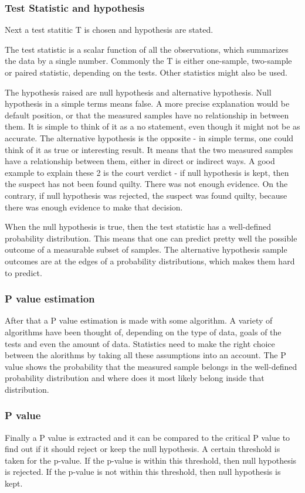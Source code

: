 \documentclass[12pt]{article}
\begin{document}
\subsubsection{Test Statistic and hypothesis}
Next a test statitic T is chosen and hypothesis are stated.

The test statistic is a scalar function of all the observations, which summarizes the data by a single number. Commonly the T is either one-sample, two-sample or paired statistic, depending on the tests. Other statistics might also be used.

The hypothesis raised are null hypothesis and alternative hypothesis. Null hypothesis in a simple terms means false. A more precise explanation would be default position, or that the measured samples have no relationship in between them. It is simple to think of it as a no statement, even though it might not be as accurate. The alternative hypothesis is the opposite - in simple terms, one could think of it as true or interesting result. It means that the two measured samples have a relationship between them, either in direct or indirect ways. A good example to explain these 2 is the court verdict - if null hypothesis is kept, then the suspect has not been found quilty. There was not enough evidence. On the contrary, if null hypothesis was rejected, the suspect was found quilty, because there was enough evidence to make that decision.

When the null hypothesis is true, then the test statistic has a well-defined probability distribution. This means that one can predict pretty well the possible outcome of a measurable subset of samples. The alternative hypothesis sample outcomes are at the edges of a probability distributions, which makes them hard to predict.

\subsubsection{P value estimation}
After that a P value estimation is made with some algorithm. A variety of algorithms have been thought of, depending on the type of data, goals of the tests and even the amount of data. Statistics need to make the right choice between the alorithms by taking all these assumptions into an account. The P value shows the probability that the measured sample belongs in the well-defined probability distribution and where does it most likely belong inside that distribution.

\subsubsection{P value}
Finally a P value is extracted and it can be compared to the critical P value to find out if it should reject or keep the null hypothesis. A certain threshold is taken for the p-value. If the p-value is within this threshold, then null hypothesis is rejected. If the p-value is not within this threshold, then null hypothesis is kept.
\end{document}

